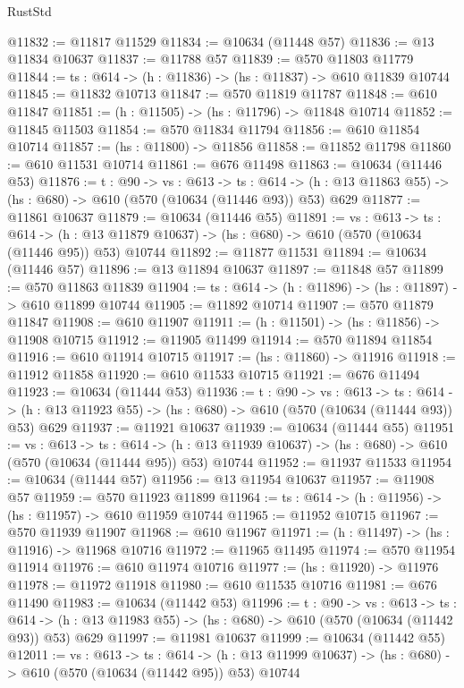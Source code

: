 \begin{lexlean}{RustStd}
\begin{coremodule}
@11832 := @11817 @11529
@11834 := @10634 (@11448 @57)
@11836 := @13 @11834 @10637
@11837 := @11788 @57
@11839 := @570 @11803 @11779
@11844 := {ts : @614} -> (h : @11836) -> (hs : @11837) -> @610 @11839 @10744
@11845 := @11832 @10713
@11847 := @570 @11819 @11787
@11848 := @610 @11847
@11851 := (h : @11505) -> (hs : @11796) -> @11848 @10714
@11852 := @11845 @11503
@11854 := @570 @11834 @11794
@11856 := @610 @11854 @10714
@11857 := (hs : @11800) -> @11856
@11858 := @11852 @11798
@11860 := @610 @11531 @10714
@11861 := @676 @11498
@11863 := @10634 (@11446 @53)
@11876 := {t : @90} ->
  {vs : @613} ->
  {ts : @614} -> (h : @13 @11863 @55) -> (hs : @680) -> @610 (@570 (@10634 (@11446 @93)) @53) @629
@11877 := @11861 @10637
@11879 := @10634 (@11446 @55)
@11891 := {vs : @613} ->
  {ts : @614} ->
  (h : @13 @11879 @10637) -> (hs : @680) -> @610 (@570 (@10634 (@11446 @95)) @53) @10744
@11892 := @11877 @11531
@11894 := @10634 (@11446 @57)
@11896 := @13 @11894 @10637
@11897 := @11848 @57
@11899 := @570 @11863 @11839
@11904 := {ts : @614} -> (h : @11896) -> (hs : @11897) -> @610 @11899 @10744
@11905 := @11892 @10714
@11907 := @570 @11879 @11847
@11908 := @610 @11907
@11911 := (h : @11501) -> (hs : @11856) -> @11908 @10715
@11912 := @11905 @11499
@11914 := @570 @11894 @11854
@11916 := @610 @11914 @10715
@11917 := (hs : @11860) -> @11916
@11918 := @11912 @11858
@11920 := @610 @11533 @10715
@11921 := @676 @11494
@11923 := @10634 (@11444 @53)
@11936 := {t : @90} ->
  {vs : @613} ->
  {ts : @614} -> (h : @13 @11923 @55) -> (hs : @680) -> @610 (@570 (@10634 (@11444 @93)) @53) @629
@11937 := @11921 @10637
@11939 := @10634 (@11444 @55)
@11951 := {vs : @613} ->
  {ts : @614} ->
  (h : @13 @11939 @10637) -> (hs : @680) -> @610 (@570 (@10634 (@11444 @95)) @53) @10744
@11952 := @11937 @11533
@11954 := @10634 (@11444 @57)
@11956 := @13 @11954 @10637
@11957 := @11908 @57
@11959 := @570 @11923 @11899
@11964 := {ts : @614} -> (h : @11956) -> (hs : @11957) -> @610 @11959 @10744
@11965 := @11952 @10715
@11967 := @570 @11939 @11907
@11968 := @610 @11967
@11971 := (h : @11497) -> (hs : @11916) -> @11968 @10716
@11972 := @11965 @11495
@11974 := @570 @11954 @11914
@11976 := @610 @11974 @10716
@11977 := (hs : @11920) -> @11976
@11978 := @11972 @11918
@11980 := @610 @11535 @10716
@11981 := @676 @11490
@11983 := @10634 (@11442 @53)
@11996 := {t : @90} ->
  {vs : @613} ->
  {ts : @614} -> (h : @13 @11983 @55) -> (hs : @680) -> @610 (@570 (@10634 (@11442 @93)) @53) @629
@11997 := @11981 @10637
@11999 := @10634 (@11442 @55)
@12011 := {vs : @613} ->
  {ts : @614} ->
  (h : @13 @11999 @10637) -> (hs : @680) -> @610 (@570 (@10634 (@11442 @95)) @53) @10744

\end{coremodule}
\end{lexlean}
